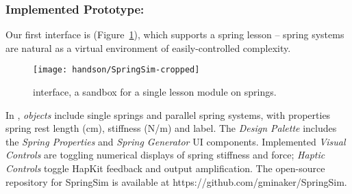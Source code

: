 
\subsubsection{Implemented Prototype: }
Our first \HandsOn interface is \SpringSim
(Figure~\ref{fig:springsim}),
which supports  a spring lesson -- spring systems are natural as a virtual environment of
 easily-controlled complexity. 
%
%
%
%
%
\begin{figure} [bt]
   \centering
   \texttt{[image: handson/SpringSim-cropped]}
   \caption{\SpringSim interface, a \HandsOn sandbox for a single lesson module on springs.}
   \label{fig:springsim}
\end{figure}
In \SpringSim, \emph{objects} include single springs and parallel spring systems, with properties
spring rest length (cm), stiffness (N/m) and label.
The \emph{Design Palette} includes the \textit{Spring Properties} and \textit{Spring Generator} UI components.
Implemented \emph{Visual Controls} are toggling numerical displays of spring stiffness and force; \emph{Haptic Controls}  toggle HapKit feedback and output amplification. The open-source repository for SpringSim is available at https://github.com/gminaker/SpringSim.
%





